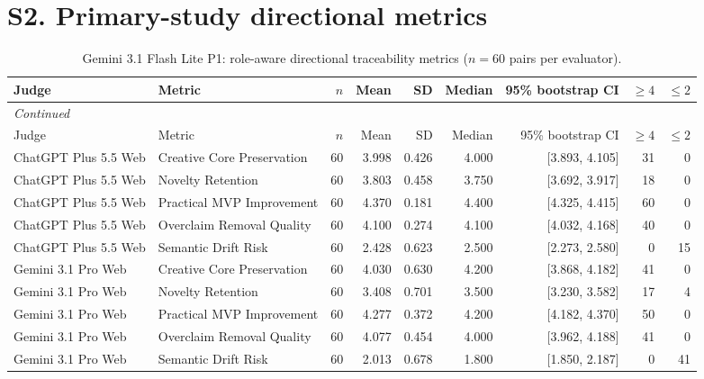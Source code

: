 \documentclass[10pt]{article}
\begin{document}
\section*{S2. Primary-study directional metrics}
\begin{landscape}
\small
\begin{longtable}{llrrrrrrr}
\caption{Gemini 3.1 Flash Lite P1: role-aware directional traceability metrics ($n=60$ pairs per evaluator).}\label{tab:s2-dir31}\\
\toprule
Judge & Metric & $n$ & Mean & SD & Median & 95\% bootstrap CI & $\geq4$ & $\leq2$ \\
\midrule\endfirsthead
\multicolumn{9}{l}{\small\itshape Continued}\\
\toprule Judge & Metric & $n$ & Mean & SD & Median & 95\% bootstrap CI & $\geq4$ & $\leq2$ \\ \midrule\endhead
\bottomrule\endfoot
ChatGPT Plus 5.5 Web & Creative Core Preservation & 60 & 3.998 & 0.426 & 4.000 & [3.893, 4.105] & 31 & 0 \\
ChatGPT Plus 5.5 Web & Novelty Retention & 60 & 3.803 & 0.458 & 3.750 & [3.692, 3.917] & 18 & 0 \\
ChatGPT Plus 5.5 Web & Practical MVP Improvement & 60 & 4.370 & 0.181 & 4.400 & [4.325, 4.415] & 60 & 0 \\
ChatGPT Plus 5.5 Web & Overclaim Removal Quality & 60 & 4.100 & 0.274 & 4.100 & [4.032, 4.168] & 40 & 0 \\
ChatGPT Plus 5.5 Web & Semantic Drift Risk & 60 & 2.428 & 0.623 & 2.500 & [2.273, 2.580] & 0 & 15 \\
Gemini 3.1 Pro Web & Creative Core Preservation & 60 & 4.030 & 0.630 & 4.200 & [3.868, 4.182] & 41 & 0 \\
Gemini 3.1 Pro Web & Novelty Retention & 60 & 3.408 & 0.701 & 3.500 & [3.230, 3.582] & 17 & 4 \\
Gemini 3.1 Pro Web & Practical MVP Improvement & 60 & 4.277 & 0.372 & 4.200 & [4.182, 4.370] & 50 & 0 \\
Gemini 3.1 Pro Web & Overclaim Removal Quality & 60 & 4.077 & 0.454 & 4.000 & [3.962, 4.188] & 41 & 0 \\
Gemini 3.1 Pro Web & Semantic Drift Risk & 60 & 2.013 & 0.678 & 1.800 & [1.850, 2.187] & 0 & 41 \\
\end{longtable}
\end{landscape}
\end{document}
